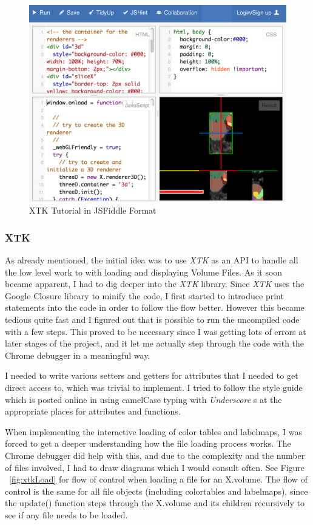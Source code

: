 \documentclass[a4paper,11pt,twoside]{article}
\begin{document}
\begin{figure}[ht!]
\centering
\includegraphics[width=140mm]{graphics/jsFiddle_01.png}
\caption{XTK Tutorial in JSFiddle Format}
\label{fig:UIdesign1}
\end{figure}




\subsubsection{XTK}


As already mentioned, the initial idea was to use \textit{XTK} as an API to handle all the low level work to with loading and displaying Volume Files. As it soon became apparent, I had to dig deeper into the \textit{XTK} library. Since \textit{XTK} uses the Google Closure library to minify the code, I first started to introduce print statements into the code in order to follow the flow better. However this became tedious quite fast and I figured out that is possible to run the uncompiled code with a few steps. This proved to be necessary since I was getting lots of errors at later stages of the project, and it let me actually step through the code with the Chrome debugger in a meaningful way.

I needed to write various setters and getters for attributes that I needed to get direct access to, which was trivial to implement. I tried to follow the style guide which is posted online in using camelCase typing with \textit{Underscore} s at the appropriate places for attributes and functions.

When implementing the interactive loading of color tables and labelmaps, I was forced to get a deeper understanding how the file loading process works. The Chrome debugger did help with this, and due to the complexity and the number of files involved, I had to draw diagrams which I would consult often. See Figure ~\ref{fig:xtkLoad} for flow of control when loading a file for an X.volume.  The flow of control is the same for all file objects (including colortables and labelmaps), since the update() function steps through the X.volume and its children recursively to see if any file needs to be loaded.
\end{document}
